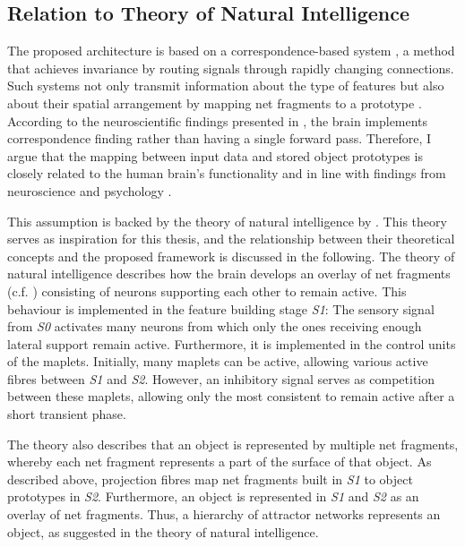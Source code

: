\subsection{Relation to Theory of Natural Intelligence}
The proposed architecture is based on a correspondence-based system , a method that achieves invariance by routing signals through rapidly changing connections. Such systems not only transmit information about the type of features but also about their spatial arrangement by mapping net fragments to a prototype .
According to the neuroscientific findings presented in , the brain implements correspondence finding rather than having a single forward pass.
Therefore, I argue that the mapping between input data and stored object prototypes is closely related to the human brain's functionality and in line with findings from neuroscience  and psychology .

This assumption is backed by the theory of natural intelligence by .
This theory serves as inspiration for this thesis, and the relationship between their theoretical concepts and the proposed framework is discussed in the following.
The theory of natural intelligence describes how the brain develops an overlay of net fragments (c.f. ) consisting of neurons supporting each other to remain active.
This behaviour is implemented in the feature building stage \emph{S1}: The sensory signal from \emph{S0} activates many neurons from which only the ones receiving enough lateral support remain active. Furthermore, it is implemented in the control units of the maplets. Initially, many maplets can be active, allowing various active fibres between \emph{S1} and \emph{S2}. However, an inhibitory signal serves as competition between these maplets, allowing only the most consistent to remain active after a short transient phase.

The theory also describes that an object is represented by multiple net fragments, whereby each net fragment represents a part of the surface of that object.
As described above, projection fibres map net fragments built in \emph{S1} to object prototypes in \emph{S2}. Furthermore, an object is represented in \emph{S1} and \emph{S2} as an overlay of net fragments.
Thus, a hierarchy of attractor networks represents an object, as suggested in the theory of natural intelligence.

